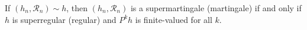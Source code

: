 If $(h_n, \mathcal{R}_n) \sim h$, then $(h_n, \mathcal{R}_n)$ is a supermartingale (martingale) if and only if $h$ is superregular (regular) and $P^k h$ is finite-valued for all $k$.
